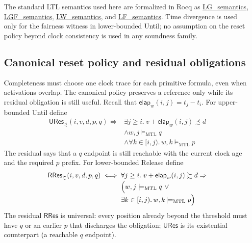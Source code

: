 \documentclass[manuscript]{acmart}
\newcommand{\satM}{\models_{\mathrm{MTL}}}
\newcommand{\elapsed}{\mathsf{elap}}
\newcommand{\Rocqid}[1]{\url{#1}}
\begin{document}
The standard LTL semantics used here are formalized in Rocq as
\Rocqid{LG_semantics}, \Rocqid{LGF_semantics},
\Rocqid{LW_semantics}, and \Rocqid{LF_semantics}. Time divergence is used
only for the fairness witness in lower-bounded Until; no assumption on the
reset policy beyond clock consistency is used in any soundness family.

\subsection{Canonical reset policy and residual obligations}
\label{subsec:canonical-policy}
Completeness must choose one clock trace for each primitive formula, even
when activations overlap. The canonical policy preserves a reference only
while its residual obligation is still useful. Recall that
$\elapsed_w(i,j)=t_j-t_i$. For upper-bounded Until define
\begin{align}
\mathsf{URes}_{\precsim}(i,v,d,p,q)\iff{}
&\exists j\ge i.\;v+\elapsed_w(i,j)\precsim d\nonumber\\[-1mm]
&\land w,j\satM q\nonumber\\[-1mm]
&\land\forall k\in[i,j).\,w,k\satM p\label{eq:ures-le}
\end{align}
The residual says that a $q$ endpoint is still reachable with the current
clock age and the required $p$ prefix. For lower-bounded Release define
\begin{align}
\mathsf{RRes}_{\succsim}(i,v,d,p,q)\iff{}
&\forall j\ge i.\;v+\elapsed_w(i,j)\succsim d\Rightarrow\nonumber\\[-1mm]
&\Bigl(w,j\satM q~\lor\nonumber\\[-1mm]
&\exists k\in[i,j).\,w,k\satM p\Bigr)\label{eq:rres-ge}
\end{align}
The residual $\mathsf{RRes}$ is universal: every position already beyond the
threshold must have $q$ or an earlier $p$ that discharges the obligation;
$\mathsf{URes}$ is its existential counterpart (a reachable $q$ endpoint).
\end{document}
